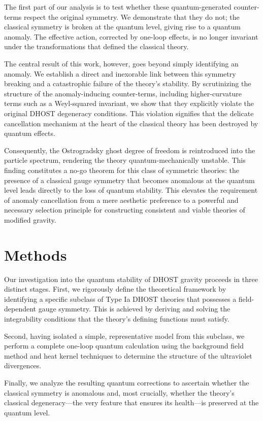 \documentclass[twocolumn]{aastex631}
\begin{document}
The first part of our analysis is to test whether these quantum-generated counter-terms respect the original symmetry. We demonstrate that they do not; the classical symmetry is broken at the quantum level, giving rise to a quantum anomaly. The effective action, corrected by one-loop effects, is no longer invariant under the transformations that defined the classical theory.

The central result of this work, however, goes beyond simply identifying an anomaly. We establish a direct and inexorable link between this symmetry breaking and a catastrophic failure of the theory's stability. By scrutinizing the structure of the anomaly-inducing counter-terms, including higher-curvature terms such as a Weyl-squared invariant, we show that they explicitly violate the original DHOST degeneracy conditions. This violation signifies that the delicate cancellation mechanism at the heart of the classical theory has been destroyed by quantum effects.

Consequently, the Ostrogradsky ghost degree of freedom is reintroduced into the particle spectrum, rendering the theory quantum-mechanically unstable. This finding constitutes a no-go theorem for this class of symmetric theories: the presence of a classical gauge symmetry that becomes anomalous at the quantum level leads directly to the loss of quantum stability. This elevates the requirement of anomaly cancellation from a mere aesthetic preference to a powerful and necessary selection principle for constructing consistent and viable theories of modified gravity.

\section{Methods}
\label{sec:methods}
Our investigation into the quantum stability of DHOST gravity proceeds in three distinct stages. First, we rigorously define the theoretical framework by identifying a specific subclass of Type Ia DHOST theories that possesses a field-dependent gauge symmetry. This is achieved by deriving and solving the integrability conditions that the theory's defining functions must satisfy.

Second, having isolated a simple, representative model from this subclass, we perform a complete one-loop quantum calculation using the background field method and heat kernel techniques to determine the structure of the ultraviolet divergences.

Finally, we analyze the resulting quantum corrections to ascertain whether the classical symmetry is anomalous and, most crucially, whether the theory's classical degeneracy---the very feature that ensures its health---is preserved at the quantum level.
\end{document}
